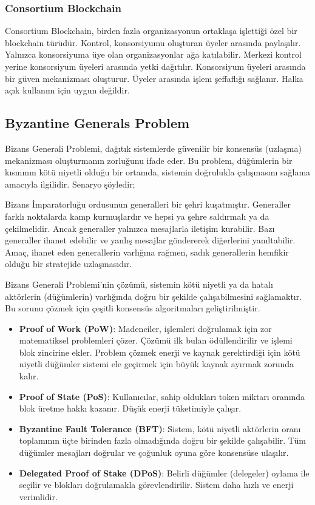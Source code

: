 \subsubsection{Consortium Blockchain}

Consortium Blockchain, birden fazla organizasyonun ortaklaşa işlettiği özel bir blockchain türüdür. Kontrol, konsorsiyumu oluşturan üyeler arasında paylaşılır.  Yalnızca konsorsiyuma üye olan organizasyonlar ağa katılabilir. Merkezi kontrol yerine konsorsiyum üyeleri arasında yetki dağıtılır. Konsorsiyum üyeleri arasında bir güven mekanizması oluşturur. Üyeler arasında işlem şeffaflığı sağlanır. Halka açık kullanım için uygun değildir.

\subsection{Byzantine Generals Problem}

Bizans Generali Problemi, dağıtık sistemlerde güvenilir bir konsensüs (uzlaşma) mekanizması oluşturmanın zorluğunu ifade eder. Bu problem, düğümlerin bir kısmının kötü niyetli olduğu bir ortamda, sistemin doğrulukla çalışmasını sağlama amacıyla ilgilidir. Senaryo şöyledir;

Bizans İmparatorluğu ordusunun generalleri bir şehri kuşatmıştır. Generaller farklı noktalarda kamp kurmuşlardır ve hepsi ya şehre saldırmalı ya da çekilmelidir. Ancak generaller yalnızca mesajlarla iletişim kurabilir. Bazı generaller ihanet edebilir ve yanlış mesajlar göndererek diğerlerini yanıltabilir. Amaç, ihanet eden generallerin varlığına rağmen, sadık generallerin hemfikir olduğu bir stratejide uzlaşmasıdır. 

Bizans Generali Problemi'nin çözümü, sistemin kötü niyetli ya da hatalı aktörlerin (düğümlerin) varlığında doğru bir şekilde çalışabilmesini sağlamaktır. Bu sorunu çözmek için çeşitli konsensüs algoritmaları geliştirilmiştir.

\begin{itemize}
    \item \textbf{Proof of Work (PoW)}: Madenciler, işlemleri doğrulamak için zor matematiksel problemleri çözer. Çözümü ilk bulan ödüllendirilir ve işlemi blok zincirine ekler. Problem çözmek enerji ve kaynak gerektirdiği için kötü niyetli düğümler sistemi ele geçirmek için büyük kaynak ayırmak zorunda kalır.
    \item \textbf{Proof of State (PoS)}: Kullanıcılar, sahip oldukları token miktarı oranında blok üretme hakkı kazanır. Düşük enerji tüketimiyle çalışır.
    \item \textbf{Byzantine Fault Tolerance (BFT)}: Sistem, kötü niyetli aktörlerin oranı toplamının üçte birinden fazla olmadığında doğru bir şekilde çalışabilir. Tüm düğümler mesajları doğrular ve çoğunluk oyuna göre konsensüse ulaşılır.
    \item \textbf{Delegated Proof of Stake (DPoS)}: Belirli düğümler (delegeler) oylama ile seçilir ve blokları doğrulamakla görevlendirilir. Sistem daha hızlı ve enerji verimlidir.
\end{itemize}

